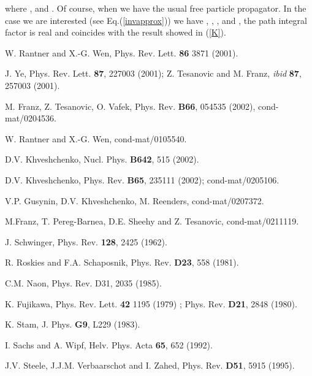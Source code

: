 \documentclass[a4paper,12pt]{article}
\begin{document}
where \coordHE{}, and \coordHE{}.   
Of course, when \coordHE{} we have the usual free particle propagator. 
In the case we are interested (see Eq.(\ref{invapprox})) we have \coordHE{}, \coordHE{}, \coordHE{}, and \coordHE{}, the path integral factor is real and coincides with the result showed in (\ref{K}).


\begin{thebibliography}{99}

 W. Rantner and X.-G. Wen, Phys. Rev. Lett. {\bf 86} 3871 (2001).

 J. Ye, Phys. Rev. Lett. {\bf 87}, 227003 (2001); Z. Tesanovic and M. Franz, {\it ibid} {\bf 87}, 257003 (2001).

  M. Franz, Z. Tesanovic, O. Vafek,
Phys. Rev. {\bf B66}, 054535 (2002), cond-mat/0204536.

 W. Rantner and X.-G. Wen, cond-mat/0105540.

 D.V. Khveshchenko, Nucl. Phys. {\bf B642}, 515 (2002).

 D.V. Khveshchenko, Phys. Rev. {\bf B65}, 235111 (2002); cond-mat/0205106.

 V.P. Gusynin, D.V. Khveshchenko, M. Reenders, cond-mat/0207372.

 M.Franz, T. Pereg-Barnea, D.E. Sheehy and Z. Tesanovic, cond-mat/0211119.

 J. Schwinger, Phys. Rev. {\bf 128}, 2425 (1962).

 R. Roskies and F.A. Schaposnik, Phys. Rev. {\bf D23}, 558
(1981).

 C.M. Naon, Phys. Rev. {D31}, 2035 (1985). 

 K. Fujikawa, Phys. Rev. Lett. {\bf 42} 1195 (1979) ; Phys. Rev. {\bf D21}, 2848 (1980).

 K. Stam, J. Phys. {\bf G9}, L229 (1983).

 I. Sachs and A. Wipf, Helv. Phys. Acta {\bf 65}, 652 (1992).

 J.V. Steele, J.J.M. Verbaarschot and I. Zahed, Phys. Rev. {\bf D51}, 5915
(1995).

\end{thebibliography}
\end{document}
